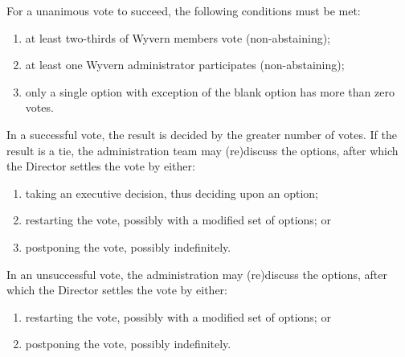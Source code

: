 \begin{enumerate}
    \begin{item}
        For a unanimous vote to succeed, the following conditions must be met:
        \begin{enumerate}
            \item at least two-thirds of Wyvern members vote (non-abstaining);
            \item at least one Wyvern administrator participates (non-abstaining);
            \item only a single option with exception of the blank option has more than zero votes.
        \end{enumerate}
    \end{item}

    \begin{item}
        In a successful vote, the result is decided by the greater number of votes. If the result is a tie, the administration team may (re)discuss the options, after which the Director settles the vote by either:
        \begin{enumerate}
            \item taking an executive decision, thus deciding upon an option;
            \item restarting the vote, possibly with a modified set of options; or
            \item postponing the vote, possibly indefinitely.
        \end{enumerate}
    \end{item}

    \begin{item}
        In an unsuccessful vote, the administration may (re)discuss the options, after which the Director settles the vote by either:
        \begin{enumerate}
            \item restarting the vote, possibly with a modified set of options; or
            \item postponing the vote, possibly indefinitely.
        \end{enumerate}
    \end{item}

\end{enumerate}
